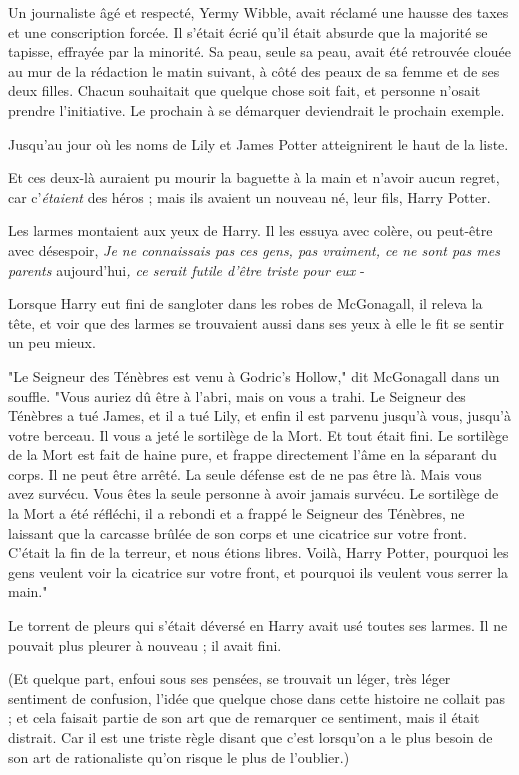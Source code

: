 Un journaliste âgé et respecté, Yermy Wibble, avait réclamé une hausse des taxes et une conscription forcée. Il s'était écrié qu'il était absurde que la majorité se tapisse, effrayée par la minorité. Sa peau, seule sa peau, avait été retrouvée clouée au mur de la rédaction le matin suivant, à côté des peaux de sa femme et de ses deux filles. Chacun souhaitait que quelque chose soit fait, et personne n'osait prendre l'initiative. Le prochain à se démarquer deviendrait le prochain exemple.

Jusqu'au jour où les noms de Lily et James Potter atteignirent le haut de la liste.

Et ces deux-là auraient pu mourir la baguette à la main et n'avoir aucun regret, car c'\emph{étaient}  des héros ; mais ils avaient un nouveau né, leur fils, Harry Potter.

Les larmes montaient aux yeux de Harry. Il les essuya avec colère, ou peut-être avec désespoir, \emph{Je ne connaissais pas ces gens, pas vraiment, ce ne sont pas mes parents } aujourd'hui\emph{, ce serait futile d'être triste pour eux}  -

Lorsque Harry eut fini de sangloter dans les robes de McGonagall, il releva la tête, et voir que des larmes se trouvaient aussi dans ses yeux à elle le fit se sentir un peu mieux.

"Le Seigneur des Ténèbres est venu à Godric's Hollow," dit McGonagall dans un souffle. "Vous auriez dû être à l'abri, mais on vous a trahi. Le Seigneur des Ténèbres a tué James, et il a tué Lily, et enfin il est parvenu jusqu'à vous, jusqu'à votre berceau. Il vous a jeté le sortilège de la Mort. Et tout était fini. Le sortilège de la Mort est fait de haine pure, et frappe directement l'âme en la séparant du corps. Il ne peut être arrêté. La seule défense est de ne pas être là. Mais vous avez survécu. Vous êtes la seule personne à avoir jamais survécu. Le sortilège de la Mort a été réfléchi, il a rebondi et a frappé le Seigneur des Ténèbres, ne laissant que la carcasse brûlée de son corps et une cicatrice sur votre front. C'était la fin de la terreur, et nous étions libres. Voilà, Harry Potter, pourquoi les gens veulent voir la cicatrice sur votre front, et pourquoi ils veulent vous serrer la main."

Le torrent de pleurs qui s'était déversé en Harry avait usé toutes ses larmes. Il ne pouvait plus pleurer à nouveau ; il avait fini.

(Et quelque part, enfoui sous ses pensées, se trouvait un léger, très léger sentiment de confusion, l'idée que quelque chose dans cette histoire ne collait pas ; et cela faisait partie de son art que de remarquer ce sentiment, mais il était distrait. Car il est une triste règle disant que c'est lorsqu'on a le plus besoin de son art de rationaliste qu'on risque le plus de l'oublier.)

